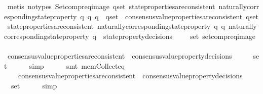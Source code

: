 \begin{isabellebody}
\ {\isacharparenleft}metis\ {\isacharparenleft}no{\isacharunderscore}types{\isacharparenright}\ Setcompr{\isacharunderscore}eq{\isacharunderscore}image\ {\isacartoucheopen}{\isasymforall}q{\isacharunderscore}set{\isachardot}\ state{\isacharunderscore}properties{\isacharunderscore}are{\isacharunderscore}consistent\ {\isacharbraceleft}naturally{\isacharunderscore}corresponding{\isacharunderscore}state{\isacharunderscore}property\ q\ {\isacharbar}q{\isachardot}\ q\ {\isasymin}\ q{\isacharunderscore}set{\isacharbraceright}\ {\isasymlongrightarrow}\ consensus{\isacharunderscore}value{\isacharunderscore}properties{\isacharunderscore}are{\isacharunderscore}consistent\ q{\isacharunderscore}set{\isacartoucheclose}\ {\isacartoucheopen}state{\isacharunderscore}properties{\isacharunderscore}are{\isacharunderscore}consistent\ {\isacharbraceleft}naturally{\isacharunderscore}corresponding{\isacharunderscore}state{\isacharunderscore}property\ q\ {\isacharbar}q{\isachardot}\ naturally{\isacharunderscore}corresponding{\isacharunderscore}state{\isacharunderscore}property\ q\ {\isasymin}\ {\isasymUnion}{\isacharbraceleft}state{\isacharunderscore}property{\isacharunderscore}decisions\ {\isasymsigma}\ {\isacharbar}{\isasymsigma}{\isachardot}\ {\isasymsigma}\ {\isasymin}\ {\isasymsigma}{\isacharunderscore}set{\isacharbraceright}{\isacharbraceright}{\isacartoucheclose}\ setcompr{\isacharunderscore}eq{\isacharunderscore}image{\isacharparenright}\isanewline
\ \ \isamarkupfalse%
\isanewline
\ \ \isamarkupfalse%
\ {\isachardoublequoteopen}consensus{\isacharunderscore}value{\isacharunderscore}properties{\isacharunderscore}are{\isacharunderscore}consistent\ {\isacharparenleft}{\isasymUnion}\ {\isacharbraceleft}consensus{\isacharunderscore}value{\isacharunderscore}property{\isacharunderscore}decisions\ {\isasymsigma}\ {\isacharbar}\ {\isasymsigma}{\isachardot}\ {\isasymsigma}\ {\isasymin}\ {\isasymsigma}{\isacharunderscore}set{\isacharbraceright}{\isacharparenright}{\isachardoublequoteclose}\isanewline
\ \ \ \ \isamarkupfalse%
\ simp\isanewline
\ \ \ \ \isamarkupfalse%
\ {\isacharparenleft}smt\ mem{\isacharunderscore}Collect{\isacharunderscore}eq{\isacharparenright}\isanewline
\ \ \isamarkupfalse%
\isanewline
\ \ \ \ {\isachardoublequoteopen}consensus{\isacharunderscore}value{\isacharunderscore}properties{\isacharunderscore}are{\isacharunderscore}consistent\ {\isacharparenleft}{\isasymUnion}\ {\isacharbraceleft}consensus{\isacharunderscore}value{\isacharunderscore}property{\isacharunderscore}decisions\ {\isasymsigma}\ {\isacharbar}\ {\isasymsigma}{\isachardot}\ {\isasymsigma}\ {\isasymin}\ {\isasymsigma}{\isacharunderscore}set{\isacharbraceright}{\isacharparenright}{\isachardoublequoteclose}\isanewline
\ \ \ \ \isamarkupfalse%
\ simp\isanewline
{}\isamarkupfalse%
%
\endisatagproof
{\isafoldproof}%
%
\isadelimproof
\isanewline
%
\endisadelimproof
%
\isadelimtheory
\isanewline
%
\endisadelimtheory
%
\isatagtheory
{}\isamarkupfalse%
%
\endisatagtheory
{\isafoldtheory}%
%
\isadelimtheory
%
\endisadelimtheory
%
\end{isabellebody}%
